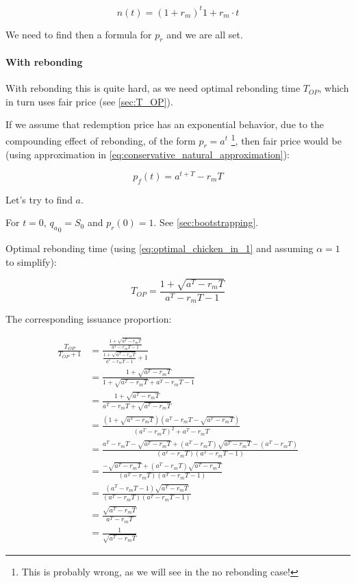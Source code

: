 \documentclass{article}
\begin{document}
\begin{equation}
  \label{eq:conservative_natural_approximation}
n(t) = (1 + r_m)^t 1 + r_m \cdot t
\end{equation}

We need to find then a formula for $p_r$ and we are all set.

\paragraph{With rebonding}
With rebonding this is quite hard, as we need optimal rebonding time $T_{OP}$, which in turn uses fair price (see \ref{sec:T_OP}).

If we assume that redemption price has an exponential behavior, due to the compounding effect of rebonding, of the form $p_r = a^t$ \footnote{This is probably wrong, as we will see in the no rebonding case!}, then fair price would be (using approximation in \ref{eq:conservative_natural_approximation}):

\begin{equation}
  \label{eq:conservative-2}
p_f(t) = a^{t+T} - r_m T
\end{equation}

Let’s try to find $a$.

For $t=0$, ${q_a}_0 = S_0$ and $p_r(0) = 1$. See \ref{sec:bootstrapping}.

Optimal rebonding time (using \ref{eq:optimal_chicken_in_1} and assuming $\alpha = 1$ to simplify):

\begin{equation}
  \label{eq:conservative_T_OP}
T_{OP} = \frac{1+ \sqrt{a^T - r_mT}}{a^T - r_mT - 1}
\end{equation}

The corresponding issuance proportion:

\begin{equation}
  \label{eq:conservative_issuance_proportion}
  \begin{split}
  \frac{T_{OP}}{T_{OP} + 1} & = \frac{\frac{1+ \sqrt{a^T - r_mT}}{a^T - r_mT - 1}}{\frac{1+ \sqrt{a^T - r_mT}}{a^T - r_mT - 1} + 1} \\
  & = \frac{1+ \sqrt{a^T - r_mT}}{1+ \sqrt{a^T - r_mT} + a^T - r_mT - 1} \\
  & = \frac{1+ \sqrt{a^T - r_mT}}{a^T - r_mT + \sqrt{a^T - r_mT}} \\
  & = \frac{(1+ \sqrt{a^T - r_mT})(a^T - r_mT - \sqrt{a^T - r_mT})}{(a^T - r_mT)^2 + a^T - r_mT} \\
  & = \frac{a^T - r_mT - \sqrt{a^T - r_mT} + (a^T - r_mT)\sqrt{a^T - r_mT} - (a^T - r_mT)}{(a^T - r_mT)(a^T - r_mT - 1)} \\
  & = \frac{- \sqrt{a^T - r_mT} + (a^T - r_mT)\sqrt{a^T - r_mT}}{(a^T - r_mT)(a^T - r_mT - 1)} \\
  & = \frac{(a^T - r_mT - 1)\sqrt{a^T - r_mT}}{(a^T - r_mT)(a^T - r_mT - 1)} \\
  & = \frac{\sqrt{a^T - r_mT}}{a^T - r_mT} \\
  & = \frac{1}{\sqrt{a^T - r_mT}}
  \end{split}
\end{equation}
\end{document}
